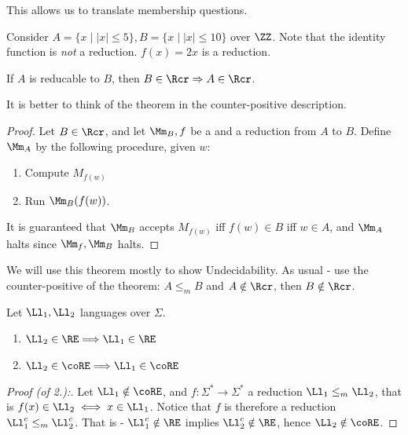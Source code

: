 \begin{remark}
	This allows us to translate membership questions.
\end{remark}
\begin{example}
	Consider $A = \{x\mid |x|\leq 5\}, B = \{x\mid |x|\leq 10\}$ over $\ZZ$. Note that the identity function is \emph{not} a reduction. $f(x) = 2x$ is a reduction.
\end{example}
\begin{blueBox}
	\begin{thm}
		If $A$ is reducable to $B$, then $B\in \Rcr \Rightarrow A\in \Rcr$.
	\end{thm}
\begin{remark}
	It is better to think of the theorem in the counter-positive description.
\end{remark}
\end{blueBox}
\begin{proof}
	Let $B\in \Rcr$, and let $\Mm_B,f$ be a \TM and a reduction from $A$ to $B$. Define $\Mm_A$ by the following procedure, given $w$:
	\begin{enumerate}
		\item Compute $M_{f(w)}$
		\item Run $\Mm_B(f(w))$.
	\end{enumerate}
	It is guaranteed that $\Mm_B$ accepts $M_{f(w)}$ iff $f(w)\in B$ iff $w\in A$, and $\Mm_A$ halts since $\Mm_f, \Mm_B$ halts.
\end{proof}
\begin{remark}
	We will use this theorem mostly to show Undecidability. As usual - use the counter-positive of the theorem: $A\leq_m B$ and $A\notin \Rcr$, then $B\notin \Rcr$.
\end{remark}
\begin{blueBox}
	\begin{thm} Let $\Ll_1,\Ll_2$ languages over $\Sigma$.
	\begin{enumerate}
		\item $\Ll_2\in \RE \Longrightarrow \Ll_1\in \RE$
		\item $\Ll_2\in \coRE \Longrightarrow \Ll_1\in \coRE$
	\end{enumerate}
\end{thm}
\end{blueBox}
\begin{proof}
	[Proof (of 2.):]
	Let $\Ll_1\notin \coRE$, and $f:\Sigma^* \to \Sigma^*$ a reduction $\Ll_1\leq_m \Ll_2$, that is $f(x)\in \Ll_2 \iff x\in \Ll_1$. Notice that $f$ is therefore a reduction $\Ll_1^c \leq_m \Ll_2^c$. That is - $\Ll_1^c\notin \RE$ implies $\Ll_2^c\notin \RE$, hence $\Ll_2\notin\coRE$.
\end{proof}
